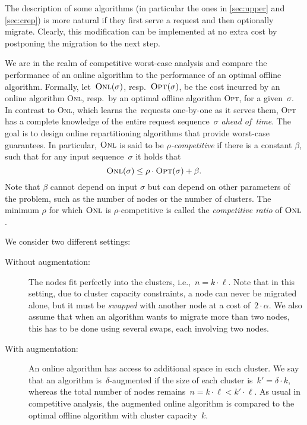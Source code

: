 \documentclass{siamart190516}
\newcommand{\ONL}{\textsc{Onl}\xspace}
\newcommand{\OPT}{\textsc{Opt}\xspace}
\begin{document}
The description of some algorithms (in particular the ones in \cref{sec:upper}
and \cref{sec:crep}) is more natural if they first serve a request and then
optionally migrate. Clearly, this modification can be implemented at no extra cost by
postponing the migration to the next step.

We are in the realm of competitive worst-case analysis and compare the
performance of an online algorithm to the performance of an optimal offline
algorithm. Formally, let~$\ONL(\sigma)$, resp.~$\OPT(\sigma)$, be the cost
incurred by an online algorithm \ONL, resp.~by an optimal offline
algorithm \OPT, for a given~$\sigma$. In contrast to \ONL, which learns the~requests one-by-one as
it serves them, \OPT has a complete knowledge of the entire request
sequence~$\sigma$ \emph{ahead of~time}. The goal is to design online repartitioning
algorithms that provide worst-case guarantees. In particular, $\ONL$ is said
to be \emph{$\rho$-competitive} if there is a constant $\beta$, such that for any
input sequence~$\sigma$ it holds that
\[
	\ONL(\sigma) \leq \rho \cdot \OPT(\sigma) + \beta.
\]
Note that $\beta$ cannot depend on input $\sigma$ but can depend on other
parameters of the problem, such as the number of nodes or the number of clusters.
The minimum $\rho$ for which $\ONL$ is $\rho$-competitive is called the 
\emph{competitive ratio} of $\ONL$. 

We consider two different settings:

\begin{description}

\item[Without augmentation:] The nodes fit perfectly into the clusters,
i.e.,~$n=k\cdot \ell$. Note that in this setting, due to cluster capacity
constraints, a node can never be migrated alone, but it must be \emph{swapped}
with another node at a cost of~$2 \cdot \alpha$. We also assume that when an
algorithm wants to migrate more than two nodes, this has to be done using
several swaps, each involving two nodes.

\item[With augmentation:] An online algorithm has access to additional space
in each cluster. We say that an algorithm is~$\delta$-augmented if the size of
each cluster is~$k' = \delta \cdot k$, whereas the total number of nodes
remains~$n = k\cdot \ell < k'\cdot \ell$. As usual in competitive analysis,
the augmented online algorithm is compared to the optimal offline algorithm
with cluster capacity~$k$.
\end{description}
\end{document}
